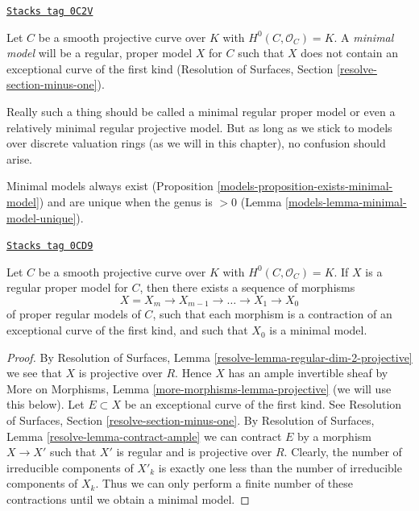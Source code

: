\begin{definition}
\label{models-definition-minimal-model}
\href{https://stacks.math.columbia.edu/tag/0C2V}{\texttt{Stacks tag 0C2V}}

Let $C$ be a smooth projective curve over $K$ with
$H^0(C, \mathcal{O}_C) = K$. A {\it minimal model}
will be a regular, proper model $X$ for $C$ such that
$X$ does not contain an exceptional curve of the first kind
(Resolution of Surfaces, Section \ref{resolve-section-minus-one}).
\end{definition}

Really such a thing should be called a minimal regular proper model
or even a relatively minimal regular projective model. But as long
as we stick to models over discrete valuation rings (as we will
in this chapter), no confusion should arise.

\medskip\noindent
Minimal models always exist
(Proposition \ref{models-proposition-exists-minimal-model}) and are unique
when the genus is $> 0$ (Lemma \ref{models-lemma-minimal-model-unique}).

\begin{lemma}
\label{models-lemma-pre-exists-minimal-model}
\href{https://stacks.math.columbia.edu/tag/0CD9}{\texttt{Stacks tag 0CD9}}


Let $C$ be a smooth projective curve over $K$ with
$H^0(C, \mathcal{O}_C) = K$. If $X$ is a regular proper
model for $C$, then there exists a sequence of morphisms
$$
X = X_m \to X_{m - 1} \to \ldots \to X_1 \to X_0
$$
of proper regular models of $C$, such that each morphism is a
contraction of an exceptional curve of the first kind, and such
that $X_0$ is a minimal model.
\end{lemma}

\begin{proof}
By Resolution of Surfaces, Lemma \ref{resolve-lemma-regular-dim-2-projective}
we see that $X$ is projective over $R$. Hence $X$ has an ample
invertible sheaf by
More on Morphisms, Lemma \ref{more-morphisms-lemma-projective}
(we will use this below).
Let $E \subset X$ be an exceptional curve of the first kind.
See Resolution of Surfaces, Section \ref{resolve-section-minus-one}.
By Resolution of Surfaces, Lemma \ref{resolve-lemma-contract-ample}
we can contract $E$ by a morphism $X \to X'$ such that $X'$ is
regular and is projective over $R$. Clearly, the number of
irreducible components of $X'_k$ is exactly one less than the
number of irreducible components of $X_k$. Thus we can only
perform a finite number of these contractions until we
obtain a minimal model.
\end{proof}

